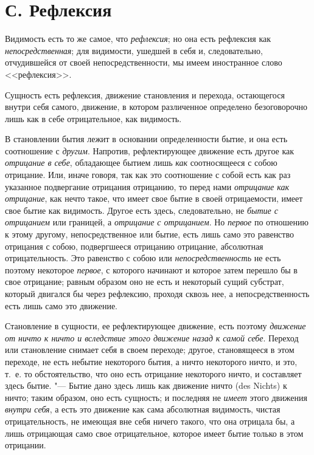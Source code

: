 \section[С. Рефлексия]{С. Рефлексия}
Видимость есть то же самое, что
{\em рефлексия}; но она есть рефлексия как
{\em непосредственная}; для видимости, ушедшей в себя
и, следовательно, отчудившейся от своей непосредственности, мы имеем
иностранное слово <<рефлексия>>.

Сущность есть рефлексия, движение становления и перехода, остающегося внутри
себя самого, движение, в котором различенное определено безоговорочно лишь
как в себе отрицательное, как видимость.

В становлении бытия лежит в основании определенности бытие, и она есть
соотношение с {\em другим}. Напротив, рефлектирующее
движение есть другое как {\em отрицание в себе},
обладающее бытием лишь {\em как} соотносящееся с собою
отрицание. Или, иначе говоря, так как это соотношение с собой есть как раз
указанное подвергание отрицания отрицанию, то перед нами
{\em отрицание как отрицание}, как нечто такое, что
имеет свое бытие в своей отрицаемости, имеет свое бытие как видимость.
Другое есть здесь, следовательно, не {\em бытие с
отрицанием} или границей, а {\em отрицание с
отрицанием}. Но {\em первое} по отношению к этому
другому, непосредственное или бытие, есть лишь само это равенство отрицания
с собою, подвергшееся отрицанию отрицание, абсолютная отрицательность. Это
равенство с собою или {\em непосредственность} не есть
поэтому некоторое {\em первое}, с которого начинают и
которое затем перешло бы в свое отрицание; равным образом оно не есть и
некоторый сущий субстрат, который двигался бы через рефлексию, проходя
сквозь нее, а непосредственность есть лишь само это движение.

Становление в сущности, ее рефлектирующее движение, есть поэтому
{\em движение от ничто к ничто и вследствие этого
движение назад к самой себе}. Переход или становление снимает себя в своем
переходе; другое, становящееся в этом переходе, не есть небытие некоторого
бытия, а ничто некоторого ничто, и это, т.~е. то обстоятельство, что оно
есть отрицание некоторого ничто, и составляет здесь бытие. "--- Бытие дано
здесь лишь как движение ничто (des Nichts) к ничто; таким образом, оно есть
сущность; и последняя не {\em имеет} этого движения
{\em внутри себя}, а есть это движение как сама
абсолютная видимость, чистая отрицательность, не имеющая вне себя ничего
такого, что она отрицала бы, а лишь отрицающая само свое отрицательное,
которое имеет бытие только в этом отрицании.

